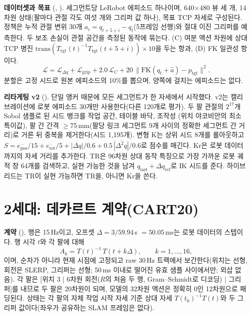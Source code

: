 \documentclass[conference,10pt]{IEEEtran}
\newcommand{\mm}{\,mm\xspace}
\begin{document}
\textbf{데이터셋과 목표} (, ). 세그먼트당 LeRobot 에피소드 하나이며,
640$\times$480 뷰 세 개, 14차원 상태(팔마다 관절 각도 여섯 개와 그리퍼 값 하나), 목표 TCP 자세로 구성된다. 정책은 누적 관절 변위
30개 $a_i=q_{t+5+i}-q_t$(5프레임 선행)와 절대 이진 그리퍼를 예측한다. 두 보조 손실이 관절 공간을 측정된 동작에 묶는다. (C) 여분
액션 차원에 상대 TCP 병진 $\mathrm{trans}(T_\text{tgt}(t)^{-1}T_\text{tgt}(t{+}5{+}i))\times10$을 두는 항과, (D) FK 일관성 항이다.
\begin{equation}
\mathcal{L}=\mathcal{L}_{\Delta q}+\mathcal{L}_\text{grip}+2.0\,\mathcal{L}_C+20\,\lVert \mathrm{FK}(q_t+\hat a)-p_\text{tgt}\rVert^2 .
\end{equation}
분할은 고정 시드로 원본 에피소드의 10\%를 뽑으며, 양쪽에 걸치는 에피소드는 없다.

\textbf{리타게팅 v2} (). 단일 앵커 때문에 모든 세그먼트가 한 자세에서 시작했다. v2는 캘리브레이션에 로봇
에피소드 30개만 사용한다(다른 120개로 평가). 두 팔 관절의 $2^{17}$개 Sobol 샘플로 된 시드 뱅크를 작업 공간, 테이블 바닥, 조작성
(위치 야코비안의 최소 특이값), 팔 간 간격 $\ge$75\mm{}(팔당 링크 세그먼트 9개 사이의 정확한 세그먼트 간 거리)로 거른 뒤 중복을
제거한다(시드 1{,}195개). 변형 K는 상위 시드 8개를 롤아웃하고
$S=\overline{e_\text{pos}}/15+\overline{e_\text{rot}}/5+\overline{|\Delta q|}/0.6+0.5\,\overline{|\Delta^2q|}/0.6$로 점수를 매긴다.
Kr은 로봇 데이터까지의 자세 거리를 추가한다. TR은 96차원 상대 동작 특징으로 가장 가까운 로봇 궤적 창 64개를 검색하고, 실현 가능한
것을 남겨 $q_\text{last}+\Delta q_\text{ref}$로 IK 시드를 준다. 하이브리드는 TR이 실현 가능하면 TR을, 아니면 Kr을 쓴다.

\section{2세대: 데카르트 계약(CART20)}\label{m:sec:gen2}
\textbf{계약} (). 행은 15\,Hz이고, 오프셋 $\Delta=3/59.94$\,s $=50.05$\,ms는 로봇 데이터의 스텝이다.
행 시각 $t$와 각 팔에 대해
\begin{equation}
A_k = T(t)^{-1}\,T(t+k\Delta),\qquad k=1,\dots,16 ,
\end{equation}
이며, 순차가 아니라 현재 시점에 고정되고 raw 30\,Hz 트랙에서 보간한다(위치는 선형, 회전은 SLERP, 그리퍼는 선형; 50\,ms 이내로
떨어진 유효 샘플 사이에서만; 외삽 없음). 각 팔은 [위치 3 $\mid$ 6차원 회전($R$의 처음 두 행, Gram--Schmidt로 디코딩) $\mid$
그리퍼]를 내므로 두 팔은 20차원이 되며, 모델의 32차원 액션은 정확히 0인 12차원으로 패딩된다. 상태는 각 팔의 자체 작업 시작 자세
기준 상대 자세 $T(t_0)^{-1}T(t)$와 두 그리퍼 값이다(좌우가 공유하는 SLAM 프레임은 없다).
\end{document}
